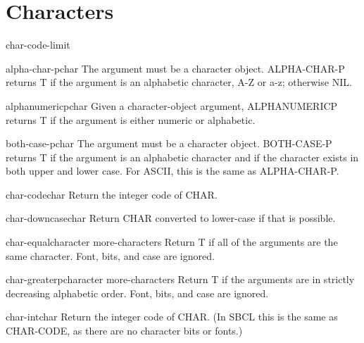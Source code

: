 \chapter{Characters}

\begin{constant}{char-code-limit}{}{}{}
  
\end{constant}

\begin{function}{alpha-char-p}{char}{}{}
  The argument must be a character object. ALPHA-CHAR-P returns T if the
   argument is an alphabetic character, A-Z or a-z; otherwise NIL.
\end{function}

\begin{function}{alphanumericp}{char}{}{}
  Given a character-object argument, ALPHANUMERICP returns T if the
   argument is either numeric or alphabetic.
\end{function}

\begin{function}{both-case-p}{char}{}{}
  The argument must be a character object. BOTH-CASE-P returns T if the
  argument is an alphabetic character and if the character exists in
  both upper and lower case. For ASCII, this is the same as ALPHA-CHAR-P.
\end{function}

\begin{function}{char-code}{char}{}{}
  Return the integer code of CHAR.
\end{function}

\begin{function}{char-downcase}{char}{}{}
  Return CHAR converted to lower-case if that is possible.
\end{function}

\begin{function}{char-equal}{character \rest more-characters}{}{}
  Return T if all of the arguments are the same character.
  Font, bits, and case are ignored.
\end{function}

\begin{function}{char-greaterp}{character \rest more-characters}{}{}
  Return T if the arguments are in strictly decreasing alphabetic order.
   Font, bits, and case are ignored.
\end{function}

\begin{function}{char-int}{char}{}{}
  Return the integer code of CHAR. (In SBCL this is the same as CHAR-CODE, as
   there are no character bits or fonts.)
\end{function}

